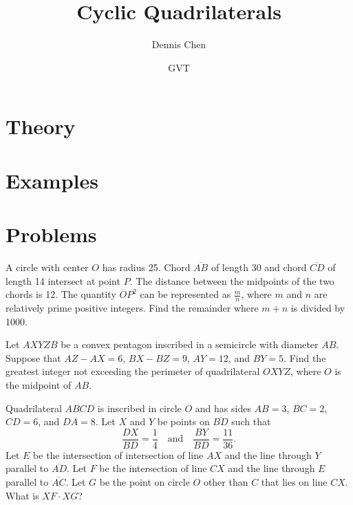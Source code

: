 \documentclass{article}
\title{Cyclic Quadrilaterals}
\author{Dennis Chen}
\date{GVT}
\begin{document}
\maketitle

\section{Theory}

\section{Examples}

\pagebreak

\section{Problems}


\begin{prob}[AIME II 2011/10]{3}
A circle with center $O$ has radius 25. Chord $\overline{AB}$ of length 30 and chord $\overline{CD}$ of length 14 intersect at point $P$. The distance between the midpoints of the two chords is 12. The quantity $OP^2$ can be represented as $\frac{m}{n}$, where $m$ and $n$ are relatively prime positive integers. Find the remainder where $m+n$ is divided by 1000.
\end{prob}

\begin{prob}{4}
Let $AXYZB$ be a convex pentagon inscribed in a semicircle with diameter $AB$. Suppose that $AZ-AX=6$, $BX-BZ=9$, $AY=12$, and $BY=5$. Find the greatest integer not exceeding the perimeter of quadrilateral $OXYZ$, where $O$ is the midpoint of $AB$.
\end{prob}

\begin{prob}[AMC 12A 2017/24]{6}
Quadrilateral $ABCD$ is inscribed in circle $O$ and has sides $AB = 3$, $BC = 2$, $CD = 6$, and $DA = 8$. Let $X$ and $Y$ be points on $\overline{BD}$ such that
\[\frac{DX}{BD} = \frac{1}{4} \quad \text{and} \quad \frac{BY}{BD} = \frac{11}{36}.\]Let $E$ be the intersection of intersection of line $AX$ and the line through $Y$ parallel to $\overline{AD}$. Let $F$ be the intersection of line $CX$ and the line through $E$ parallel to $\overline{AC}$. Let $G$ be the point on circle $O$ other than $C$ that lies on line $CX$. What is $XF \cdot XG$?
\end{prob}
\end{document}
